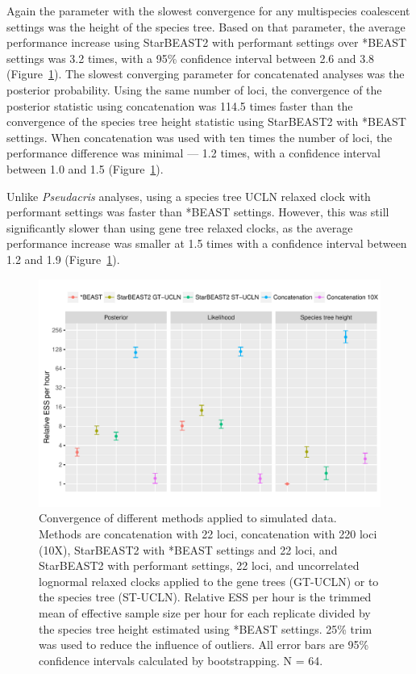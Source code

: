 \documentclass[12pt]{article}
\begin{document}
Again the parameter with the slowest convergence for any multispecies coalescent
settings was the height of the species tree. Based on that parameter, the
average performance increase using StarBEAST2 with performant settings over
*BEAST settings was 3.2 times, with a 95\% confidence interval between 2.6 and
3.8 (Figure~\ref{fig:simulatedEssPerHour}). The slowest converging parameter for
concatenated analyses was the posterior probability. Using the same number
of loci, the convergence of the posterior statistic using concatenation was
114.5 times faster than the convergence of the species tree height statistic
using StarBEAST2 with *BEAST settings. When concatenation was used with ten
times the number of loci, the performance difference was minimal --- 1.2 times,
with a confidence interval between 1.0 and 1.5 (Figure~\ref{fig:simulatedEssPerHour}).

Unlike \textit{Pseudacris} analyses, using a species tree UCLN relaxed clock with performant
settings was faster than *BEAST settings. However, this was still significantly
slower than using gene tree relaxed clocks, as the average performance increase
was smaller at 1.5 times with a confidence interval between 1.2 and 1.9
(Figure~\ref{fig:simulatedEssPerHour}).

\begin{figure}[htb!]
\centering
\includegraphics[width=16cm]{multiple_ess_per_hour.pdf}
\caption
{Convergence of different methods applied to simulated data. Methods are
concatenation with 22 loci, concatenation with 220 loci (10X), StarBEAST2 with
*BEAST settings and 22 loci, and StarBEAST2 with performant settings, 22 loci,
and uncorrelated lognormal relaxed clocks applied to the gene trees (GT-UCLN) or
to the species tree (ST-UCLN). Relative ESS per hour is the trimmed mean of
effective sample size per hour for each replicate divided by the species tree height estimated using *BEAST
settings. 25\% trim was used to reduce the influence of
outliers. All error bars are 95\% confidence intervals calculated by
bootstrapping. N = 64.}
\label{fig:simulatedEssPerHour}
\end{figure}
\end{document}
